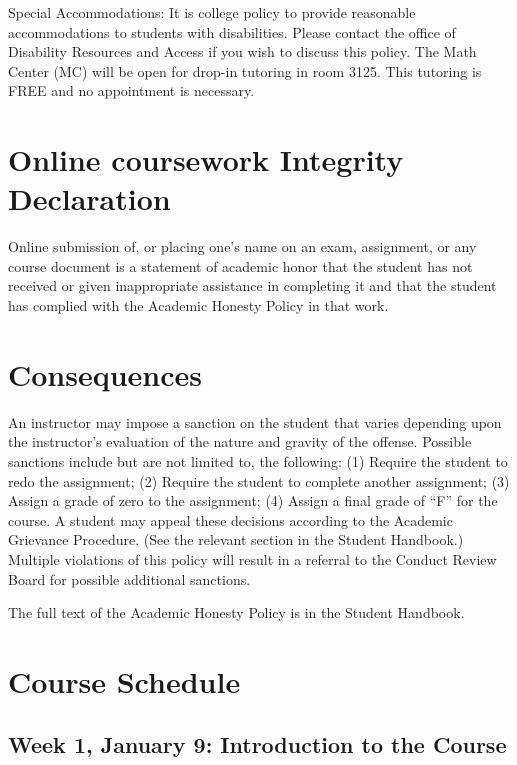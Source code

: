 \documentclass[]{article}
\begin{document}
Special Accommodations: It is college policy to provide reasonable
accommodations to students with disabilities. Please contact the office
of Disability Resources and Access if you wish to discuss this policy.
The Math Center (MC) will be open for drop-in tutoring in room 3125.
This tutoring is FREE and no appointment is necessary.

\hypertarget{online-coursework-integrity-declaration}{%
\section{Online coursework Integrity
Declaration}\label{online-coursework-integrity-declaration}}

Online submission of, or placing one's name on an exam, assignment, or
any course document is a statement of academic honor that the student
has not received or given inappropriate assistance in completing it and
that the student has complied with the Academic Honesty Policy in that
work.

\hypertarget{consequences}{%
\section{Consequences}\label{consequences}}

An instructor may impose a sanction on the student that varies depending
upon the instructor's evaluation of the nature and gravity of the
offense. Possible sanctions include but are not limited to, the
following: (1) Require the student to redo the assignment; (2) Require
the student to complete another assignment; (3) Assign a grade of zero
to the assignment; (4) Assign a final grade of ``F'' for the course. A
student may appeal these decisions according to the Academic Grievance
Procedure. (See the relevant section in the Student Handbook.) Multiple
violations of this policy will result in a referral to the Conduct
Review Board for possible additional sanctions.

The full text of the Academic Honesty Policy is in the Student Handbook.

\hypertarget{course-schedule}{%
\section{Course Schedule}\label{course-schedule}}

\hypertarget{week-1-january-9-introduction-to-the-course}{%
\subsection{Week 1, January 9: Introduction to the
Course}\label{week-1-january-9-introduction-to-the-course}}
\end{document}

